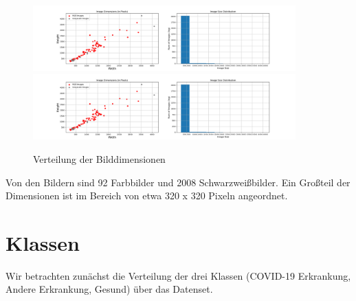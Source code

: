 \begin{figure}[H]
	\centering
	\includegraphics[trim=110px 0 0.5\imagewidth{} 0, clip,width=0.9\textwidth]{../results/image_sizes.png}
	\includegraphics[trim=0.5\imagewidth{} 0 110px 0, clip,width=0.9\textwidth]{../results/image_sizes.png}
	\caption{Verteilung der Bilddimensionen}
\end{figure}

Von den Bildern sind 92 Farbbilder und 2008 Schwarzweißbilder. Ein Großteil der Dimensionen ist im Bereich von etwa 320 x 320 Pixeln angeordnet.

\section{Klassen}

Wir betrachten zunächst die Verteilung der drei Klassen (COVID-19 Erkrankung, Andere Erkrankung, Gesund) über das Datenset.

